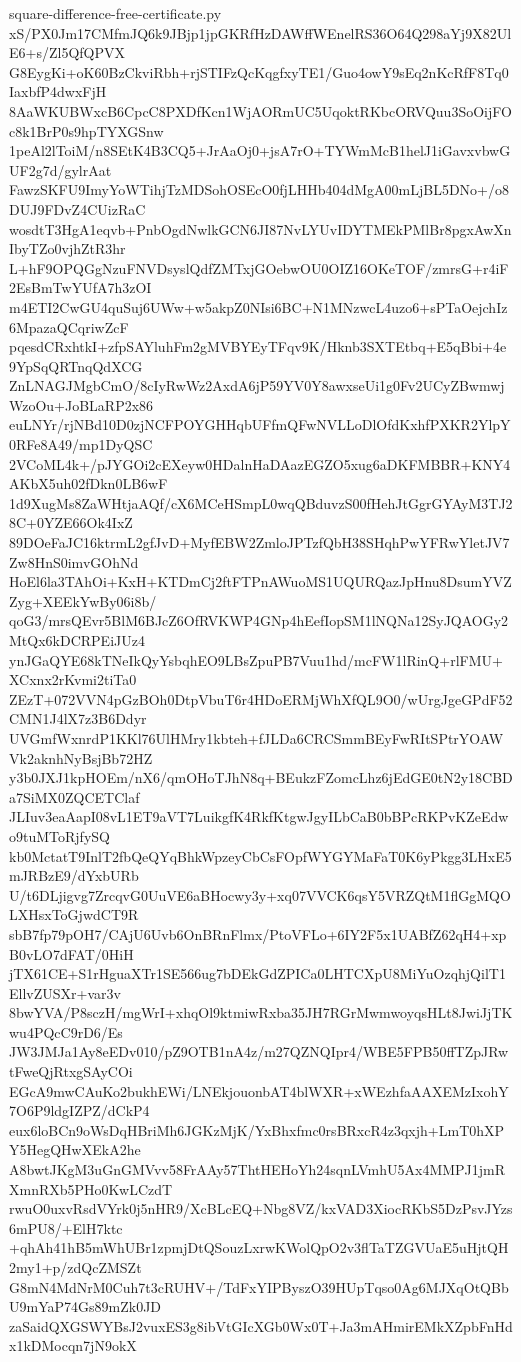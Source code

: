\documentclass[11pt]{article}
\theoremstyle{definition}
\theoremstyle{remark}
\begin{document}
\begin{filecontents*}[overwrite]{square-difference-free-certificate.py}
xS/PX0Jm17CMfmJQ6k9JBjp1jpGKRfHzDAWffWEnelRS36O64Q298aYj9X82UlE6+s/Zl5QfQPVX
G8EygKi+oK60BzCkviRbh+rjSTIFzQcKqgfxyTE1/Guo4owY9sEq2nKcRfF8Tq0IaxbfP4dwxFjH
8AaWKUBWxcB6CpcC8PXDfKcn1WjAORmUC5UqoktRKbcORVQuu3SoOijFOc8k1BrP0s9hpTYXGSnw
1peAl2lToiM/n8SEtK4B3CQ5+JrAaOj0+jsA7rO+TYWmMcB1helJ1iGavxvbwGUF2g7d/gylrAat
FawzSKFU9ImyYoWTihjTzMDSohOSEcO0fjLHHb404dMgA00mLjBL5DNo+/o8DUJ9FDvZ4CUizRaC
wosdtT3HgA1eqvb+PnbOgdNwlkGCN6JI87NvLYUvIDYTMEkPMlBr8pgxAwXnIbyTZo0vjhZtR3hr
L+hF9OPQGgNzuFNVDsyslQdfZMTxjGOebwOU0OIZ16OKeTOF/zmrsG+r4iF2EsBmTwYUfA7h3zOI
m4ETI2CwGU4quSuj6UWw+w5akpZ0NIsi6BC+N1MNzwcL4uzo6+sPTaOejchIz6MpazaQCqriwZcF
pqesdCRxhtkI+zfpSAYluhFm2gMVBYEyTFqv9K/Hknb3SXTEtbq+E5qBbi+4e9YpSqQRTnqQdXCG
ZnLNAGJMgbCmO/8cIyRwWz2AxdA6jP59YV0Y8awxseUi1g0Fv2UCyZBwmwjWzoOu+JoBLaRP2x86
euLNYr/rjNBd10D0zjNCFPOYGHHqbUFfmQFwNVLLoDlOfdKxhfPXKR2YlpY0RFe8A49/mp1DyQSC
2VCoML4k+/pJYGOi2cEXeyw0HDalnHaDAazEGZO5xug6aDKFMBBR+KNY4AKbX5uh02fDkn0LB6wF
1d9XugMs8ZaWHtjaAQf/cX6MCeHSmpL0wqQBduvzS00fHehJtGgrGYAyM3TJ28C+0YZE66Ok4IxZ
89DOeFaJC16ktrmL2gfJvD+MyfEBW2ZmloJPTzfQbH38SHqhPwYFRwYletJV7Zw8HnS0imvGOhNd
HoEl6la3TAhOi+KxH+KTDmCj2ftFTPnAWuoMS1UQURQazJpHnu8DsumYVZZyg+XEEkYwBy06i8b/
qoG3/mrsQEvr5BlM6BJcZ6OfRVKWP4GNp4hEefIopSM1lNQNa12SyJQAOGy2MtQx6kDCRPEiJUz4
ynJGaQYE68kTNeIkQyYsbqhEO9LBsZpuPB7Vuu1hd/mcFW1lRinQ+rlFMU+XCxnx2rKvmi2tiTa0
ZEzT+072VVN4pGzBOh0DtpVbuT6r4HDoERMjWhXfQL9O0/wUrgJgeGPdF52CMN1J4lX7z3B6Ddyr
UVGmfWxnrdP1KKl76UlHMry1kbteh+fJLDa6CRCSmmBEyFwRItSPtrYOAWVk2aknhNyBsjBb72HZ
y3b0JXJ1kpHOEm/nX6/qmOHoTJhN8q+BEukzFZomcLhz6jEdGE0tN2y18CBDa7SiMX0ZQCETClaf
JLIuv3eaAapI08vL1ET9aVT7LuikgfK4RkfKtgwJgyILbCaB0bBPcRKPvKZeEdwo9tuMToRjfySQ
kb0MctatT9InlT2fbQeQYqBhkWpzeyCbCsFOpfWYGYMaFaT0K6yPkgg3LHxE5mJRBzE9/dYxbURb
U/t6DLjigvg7ZrcqvG0UuVE6aBHocwy3y+xq07VVCK6qsY5VRZQtM1flGgMQOLXHsxToGjwdCT9R
sbB7fp79pOH7/CAjU6Uvb6OnBRnFlmx/PtoVFLo+6IY2F5x1UABfZ62qH4+xpB0vLO7dFAT/0HiH
jTX61CE+S1rHguaXTr1SE566ug7bDEkGdZPICa0LHTCXpU8MiYuOzqhjQilT1EllvZUSXr+var3v
8bwYVA/P8sczH/mgWrI+xhqOl9ktmiwRxba35JH7RGrMwmwoyqsHLt8JwiJjTKwu4PQcC9rD6/Es
JW3JMJa1Ay8eEDv010/pZ9OTB1nA4z/m27QZNQIpr4/WBE5FPB50ffTZpJRwtFweQjRtxgSAyCOi
EGcA9mwCAuKo2bukhEWi/LNEkjouonbAT4blWXR+xWEzhfaAAXEMzIxohY7O6P9ldgIZPZ/dCkP4
eux6loBCn9oWsDqHBriMh6JGKzMjK/YxBhxfmc0rsBRxcR4z3qxjh+LmT0hXPY5HegQHwXEkA2he
A8bwtJKgM3uGnGMVvv58FrAAy57ThtHEHoYh24sqnLVmhU5Ax4MMPJ1jmRXmnRXb5PHo0KwLCzdT
rwuO0uxvRsdVYrk0j5nHR9/XcBLcEQ+Nbg8VZ/kxVAD3XiocRKbS5DzPsvJYzs6mPU8/+ElH7ktc
+qhAh41hB5mWhUBr1zpmjDtQSouzLxrwKWolQpO2v3flTaTZGVUaE5uHjtQH2my1+p/zdQcZMSZt
G8mN4MdNrM0Cuh7t3cRUHV+/TdFxYIPByszO39HUpTqso0Ag6MJXqOtQBbU9mYaP74Gs89mZk0JD
zaSaidQXGSWYBsJ2vuxES3g8ibVtGIcXGb0Wx0T+Ja3mAHmirEMkXZpbFnHdx1kDMocqn7jN9okX

\end{filecontents*}
\end{document}
